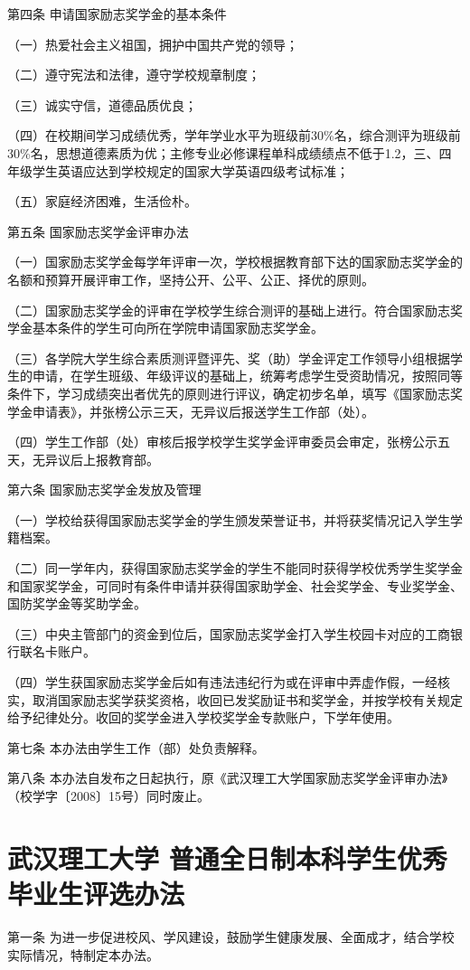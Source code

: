 \documentclass[UTF8,12pt,a4paper]{report}
\begin{document}
第四条 申请国家励志奖学金的基本条件

（一）热爱社会主义祖国，拥护中国共产党的领导；

（二）遵守宪法和法律，遵守学校规章制度；

（三）诚实守信，道德品质优良；

（四）在校期间学习成绩优秀，学年学业水平为班级前30\%名，综合测评为班级前30\%名，思想道德素质为优；主修专业必修课程单科成绩绩点不低于1.2，三、四年级学生英语应达到学校规定的国家大学英语四级考试标准；

（五）家庭经济困难，生活俭朴。

第五条 国家励志奖学金评审办法

（一）国家励志奖学金每学年评审一次，学校根据教育部下达的国家励志奖学金的名额和预算开展评审工作，坚持公开、公平、公正、择优的原则。

（二）国家励志奖学金的评审在学校学生综合测评的基础上进行。符合国家励志奖学金基本条件的学生可向所在学院申请国家励志奖学金。

（三）各学院大学生综合素质测评暨评先、奖（助）学金评定工作领导小组根据学生的申请，在学生班级、年级评议的基础上，统筹考虑学生受资助情况，按照同等条件下，学习成绩突出者优先的原则进行评议，确定初步名单，填写《国家励志奖学金申请表》，并张榜公示三天，无异议后报送学生工作部（处）。

（四）学生工作部（处）审核后报学校学生奖学金评审委员会审定，张榜公示五天，无异议后上报教育部。

第六条 国家励志奖学金发放及管理

（一）学校给获得国家励志奖学金的学生颁发荣誉证书，并将获奖情况记入学生学籍档案。

（二）同一学年内，获得国家励志奖学金的学生不能同时获得学校优秀学生奖学金和国家奖学金，可同时有条件申请并获得国家助学金、社会奖学金、专业奖学金、国防奖学金等奖助学金。

（三）中央主管部门的资金到位后，国家励志奖学金打入学生校园卡对应的工商银行联名卡账户。

（四）学生获国家励志奖学金后如有违法违纪行为或在评审中弄虚作假，一经核实，取消国家励志奖学获奖资格，收回已发奖励证书和奖学金，并按学校有关规定给予纪律处分。收回的奖学金进入学校奖学金专款账户，下学年使用。

第七条 本办法由学生工作（部）处负责解释。

第八条 本办法自发布之日起执行，原《武汉理工大学国家励志奖学金评审办法》（校学字〔2008〕15号）同时废止。
\chapter{武汉理工大学 普通全日制本科学生优秀毕业生评选办法}
第一条 为进一步促进校风、学风建设，鼓励学生健康发展、全面成才，结合学校实际情况，特制定本办法。
\end{document}
